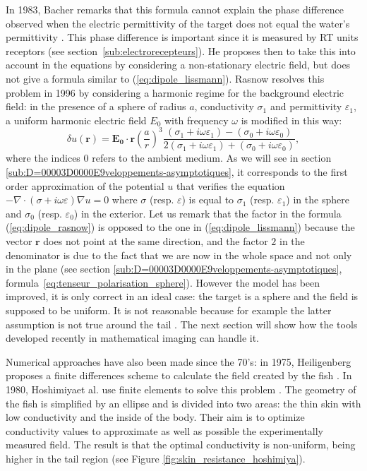 In 1983, Bacher remarks that this formula cannot explain the phase
difference observed when the electric permittivity of the target
does not equal the water's permittivity \cite{bacher1983}. This
phase difference is important since it is measured by RT units
receptors (see section~\ref{sub:electrorecepteurs}). He proposes
then to take this into account in the equations by considering a
non-stationary electric field, but does not give a formula similar
to (\ref{eq:dipole_lissmann}). Rasnow resolves this problem in
1996 by considering a harmonic regime for the background electric
field: in the presence of a sphere of radius $a$, conductivity
$\sigma_{1}$ and permittivity $\varepsilon_{1}$, a uniform
harmonic electric field $E_{0}$ with frequency $\omega$ is
modified in this way:\begin{equation} \delta
u(\boldsymbol{r})=\boldsymbol{E_{0}}\cdot\boldsymbol{r}\left(\frac{a}{r}\right)^{3}\frac{\left(\sigma_{1}
+i\omega\varepsilon_{1}\right)-\left(\sigma_{0}+i\omega\varepsilon_{0}\right)}{2\left(\sigma_{1}+i\omega\varepsilon_{1}\right)+\left(\sigma_{0}+i\omega\varepsilon_{0}\right)},\label{eq:dipole_rasnow}\end{equation}
where the indices $0$ refers to the ambient medium. As we will see
in section \ref{sub:D=00003D0000E9veloppements-asymptotiques}, it
corresponds to the first order approximation of the potential $u$
that verifies the equation
$-\nabla\cdot(\sigma+i\omega\varepsilon)\nabla u=0$ where $\sigma$
(resp. $\varepsilon$) is equal to $\sigma_{1}$ (resp.
$\varepsilon_{1}$) in the sphere and $\sigma_{0}$ (resp.
$\varepsilon_{0}$) in the exterior. Let us remark that the factor
in the formula (\ref{eq:dipole_rasnow}) is opposed to the one in
(\ref{eq:dipole_lissmann}) because the vector $\boldsymbol{r}$
does not point at the same direction, and the factor $2$ in the
denominator is due to the fact that we are now in the whole space
and not only in the plane (see section
\ref{sub:D=00003D0000E9veloppements-asymptotiques},
formula~\ref{eq:tenseur_polarisation_sphere}). However the model
has been improved, it is only correct in an ideal case: the target
is a sphere and the field is supposed to be uniform. It is not
reasonable because for example the latter assumption is not true
around the tail \cite{assad1998electric,assad1999electric}. The
next section will show how the tools developed recently in
mathematical imaging can handle it.

Numerical approaches have also been made since the 70's: in 1975,
Heiligenberg proposes a finite differences scheme to calculate the
field created by the fish \cite{heiligenberg1975theoretical}. In
1980, Hoshimiya\noun{ }et al. use finite elements to solve this problem
\cite{hoshimiya1980theapteronotus}. The geometry of the fish is simplified
by an ellipse and is divided into two areas: the thin skin with low
conductivity and the inside of the body. Their aim is to optimize
conductivity values to approximate as well as possible the experimentally
measured field. The result is that the optimal conductivity is non-uniform,
being higher in the tail region (see Figure \ref{fig:skin_resistance_hoshimiya}).

